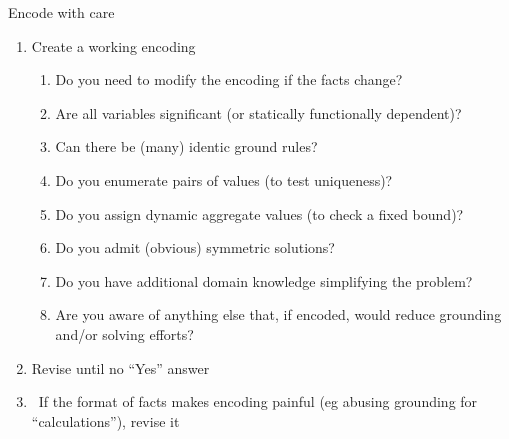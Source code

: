 \begin{frame}{Encode with care}
  \begin{enumerate}
  \item Create a \alert<1>{working} encoding
    \begin{enumerate}
    \item<2-> Do you need to modify the encoding if the facts change?
    \item<2-> Are all variables significant (or statically functionally dependent)?
    \item<2-> Can there be (many) identic ground rules?
    \item<2-> Do you enumerate pairs of values (to test uniqueness)?
    \item<2-> Do you assign dynamic aggregate values (to check a fixed bound)?
    \item<2-> Do you admit (obvious) symmetric solutions?
    \item<3-> Do you have additional domain knowledge simplifying the problem?
    \item<4-> Are you aware of anything else that, if encoded, would reduce grounding and/or solving efforts?
    \end{enumerate}
    \smallskip
  \item<5-> Revise until no ``Yes'' answer
    \smallskip
  \item<6->[]  \
    If the format of facts makes encoding painful (eg abusing grounding for ``calculations''), revise it
  \end{enumerate}
\end{frame}
